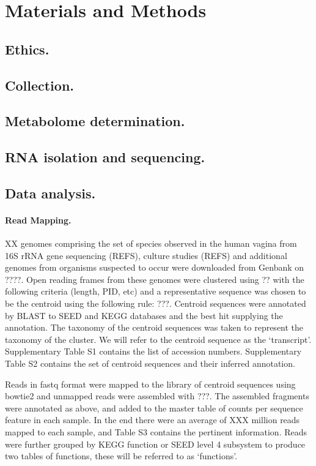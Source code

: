 \documentclass[10pt,letterpaper]{article}
\begin{document}
\section*{Materials and Methods}
\subsection*{Ethics.}
\subsection*{Collection.}
\subsection*{Metabolome determination.}
\subsection*{RNA isolation and sequencing.}
\subsection*{Data analysis.} 

\paragraph{Read Mapping.} XX genomes comprising the set of species observed in the human vagina from 16S rRNA gene sequencing (REFS), culture studies (REFS) and additional genomes from organisms suspected to occur were downloaded from Genbank on ????. Open reading frames from these genomes were clustered using ?? with the following criteria (length, PID, etc) and a representative sequence was chosen to be the centroid using the following rule: ???. Centroid sequences were annotated by BLAST to SEED and KEGG databases and the best hit supplying the annotation. The taxonomy of the centroid sequences was taken to represent the taxonomy of the cluster. We will refer to the centroid sequence as the `transcript'. Supplementary Table S1 contains the list of accession numbers. Supplementary Table S2 contains the set of centroid sequences and their inferred annotation. 

Reads in fastq format were mapped to the library of centroid sequences using bowtie2 \cite{bowtie2} and unmapped reads were assembled with ???. The assembled fragments were annotated as above, and added to the master table of counts per sequence feature in each sample. In the end there were an average of XXX million reads mapped to each sample, and Table S3 contains the pertinent information. Reads were further grouped by KEGG function or SEED level 4 subsystem to produce two tables of functions, these will be referred to as `functions'.
\end{document}

